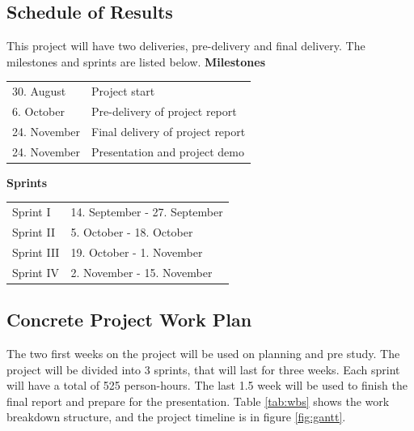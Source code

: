 \subsection{Schedule of Results}
This project will have two deliveries, pre-delivery and final delivery.  The milestones and sprints are listed below. \newline
\textbf{Milestones} \newline
\begin{tabular}{l  l}
	30. August & Project start \\
	6. October & Pre-delivery of project report \\
	24. November & Final delivery of project report \\
	24. November & Presentation and project demo \\
\end{tabular}
\newline
\textbf{Sprints} \newline
\begin{tabular}{l  l}
	Sprint I & 14. September - 27. September \\
	Sprint II & 5. October - 18. October \\
	Sprint III & 19. October - 1. November  \\
	Sprint IV & 2. November - 15. November \\
\end{tabular}

\subsection{Concrete Project Work Plan}
The two first weeks on the project will be used on planning and pre study.
The project will be divided into 3 sprints, that will last for three weeks. Each sprint will have a total of 525 person-hours.
The last 1.5 week will be used to finish the final report and prepare for the presentation. 
Table \ref{tab:wbs} shows the work breakdown structure, and the project timeline is in figure \ref{fig:gantt}.

